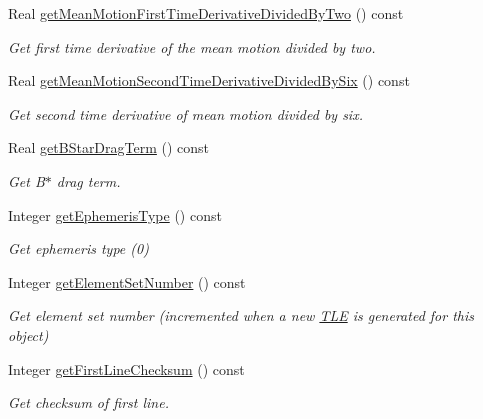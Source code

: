 \begin{DoxyCompactItemize}
Real \hyperlink{classlibrary_1_1astro_1_1trajectory_1_1orbit_1_1models_1_1sgp4_1_1_t_l_e_ae49c2e82ddcc17462f22f7fa801c81f7}{get\+Mean\+Motion\+First\+Time\+Derivative\+Divided\+By\+Two} () const
\begin{DoxyCompactList}\small\item\em Get first time derivative of the mean motion divided by two. \end{DoxyCompactList}\item 
Real \hyperlink{classlibrary_1_1astro_1_1trajectory_1_1orbit_1_1models_1_1sgp4_1_1_t_l_e_a3363891e156f11b8bbd0cfadb995477d}{get\+Mean\+Motion\+Second\+Time\+Derivative\+Divided\+By\+Six} () const
\begin{DoxyCompactList}\small\item\em Get second time derivative of mean motion divided by six. \end{DoxyCompactList}\item 
Real \hyperlink{classlibrary_1_1astro_1_1trajectory_1_1orbit_1_1models_1_1sgp4_1_1_t_l_e_aaa0c9d0b5027e2fc8a92fb8750bea6a3}{get\+B\+Star\+Drag\+Term} () const
\begin{DoxyCompactList}\small\item\em Get B$\ast$ drag term. \end{DoxyCompactList}\item 
Integer \hyperlink{classlibrary_1_1astro_1_1trajectory_1_1orbit_1_1models_1_1sgp4_1_1_t_l_e_a83621469f7943c96df43cf888d65c60b}{get\+Ephemeris\+Type} () const
\begin{DoxyCompactList}\small\item\em Get ephemeris type (0) \end{DoxyCompactList}\item 
Integer \hyperlink{classlibrary_1_1astro_1_1trajectory_1_1orbit_1_1models_1_1sgp4_1_1_t_l_e_a31ee67f84a2ed0d2353959c0d90ede84}{get\+Element\+Set\+Number} () const
\begin{DoxyCompactList}\small\item\em Get element set number (incremented when a new \hyperlink{classlibrary_1_1astro_1_1trajectory_1_1orbit_1_1models_1_1sgp4_1_1_t_l_e}{T\+LE} is generated for this object) \end{DoxyCompactList}\item 
Integer \hyperlink{classlibrary_1_1astro_1_1trajectory_1_1orbit_1_1models_1_1sgp4_1_1_t_l_e_a6cc7370618c797916a3de07be08c1050}{get\+First\+Line\+Checksum} () const
\begin{DoxyCompactList}\small\item\em Get checksum of first line. \end{DoxyCompactList}\item 

\end{DoxyCompactItemize}
